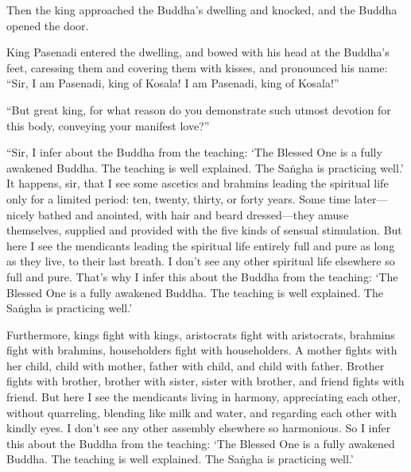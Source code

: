 \documentclass[12pt,openany]{book}%
\begin{document}
Then the king approached the Buddha’s dwelling and knocked, and the Buddha opened the door. 

King Pasenadi entered the dwelling, and bowed with his head at the Buddha’s feet, caressing them and covering them with kisses, and pronounced his name: “Sir, I am Pasenadi, king of Kosala! I am Pasenadi, king of Kosala!” 

“But great king, for what reason do you demonstrate such utmost devotion for this body, conveying your manifest love?” 

“Sir, I infer about the Buddha from the teaching: ‘The Blessed One is a fully awakened Buddha. The teaching is well explained. The \textsanskrit{Saṅgha} is practicing well.’ It happens, sir, that I see some ascetics and brahmins leading the spiritual life only for a limited period: ten, twenty, thirty, or forty years. Some time later—nicely bathed and anointed, with hair and beard dressed—they amuse themselves, supplied and provided with the five kinds of sensual stimulation. But here I see the mendicants leading the spiritual life entirely full and pure as long as they live, to their last breath. I don’t see any other spiritual life elsewhere so full and pure. That’s why I infer this about the Buddha from the teaching: ‘The Blessed One is a fully awakened Buddha. The teaching is well explained. The \textsanskrit{Saṅgha} is practicing well.’ 

Furthermore, kings fight with kings, aristocrats fight with aristocrats, brahmins fight with brahmins, householders fight with householders. A mother fights with her child, child with mother, father with child, and child with father. Brother fights with brother, brother with sister, sister with brother, and friend fights with friend. But here I see the mendicants living in harmony, appreciating each other, without quarreling, blending like milk and water, and regarding each other with kindly eyes. I don’t see any other assembly elsewhere so harmonious. So I infer this about the Buddha from the teaching: ‘The Blessed One is a fully awakened Buddha. The teaching is well explained. The \textsanskrit{Saṅgha} is practicing well.’ 
\end{document}
